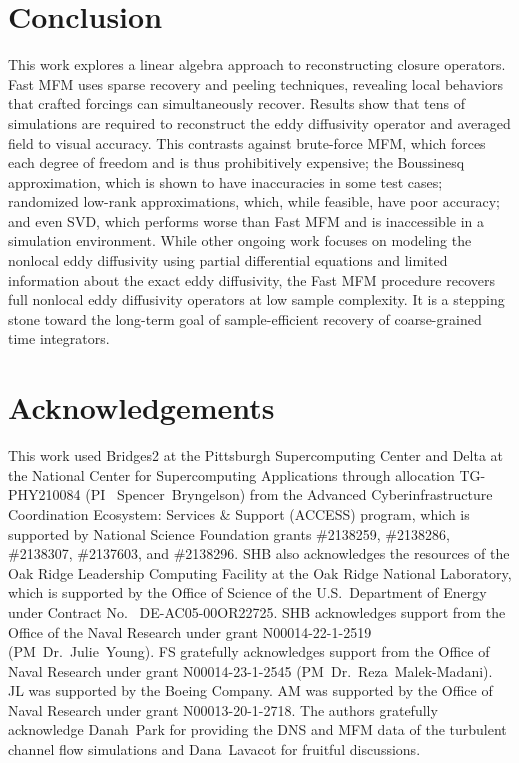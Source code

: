 \documentclass[11pt,sort&compress]{elsarticle}
\begin{document}
\section{Conclusion}\label{s:conclusions}

This work explores a linear algebra approach to reconstructing closure operators.
Fast MFM uses sparse recovery and peeling techniques, revealing local behaviors that crafted forcings can simultaneously recover.
Results show that tens of simulations are required to reconstruct the eddy diffusivity operator and averaged field to visual accuracy.
This contrasts against brute-force MFM, which forces each degree of freedom and is thus prohibitively expensive; the Boussinesq approximation, which is shown to have inaccuracies in some test cases; randomized low-rank approximations, which, while feasible, have poor accuracy; and even SVD, which performs worse than Fast MFM and is inaccessible in a simulation environment.
While other ongoing work focuses on modeling the nonlocal eddy diffusivity using partial differential equations and limited information about the exact eddy diffusivity, the Fast MFM procedure recovers full nonlocal eddy diffusivity operators at low sample complexity. 
It is a stepping stone toward the long-term goal of sample-efficient recovery of coarse-grained time integrators.

\section*{Acknowledgements}

This work used Bridges2 at the Pittsburgh Supercomputing Center and Delta at the National Center for Supercomputing Applications through allocation TG-PHY210084 (PI~ Spencer~Bryngelson) from the Advanced Cyberinfrastructure Coordination Ecosystem: Services \& Support (ACCESS) program, which is supported by National Science Foundation grants \#2138259, \#2138286, \#2138307, \#2137603, and \#2138296.
SHB also acknowledges the resources of the Oak Ridge Leadership Computing Facility at the Oak Ridge National Laboratory, which is supported by the Office of Science of the U.S.\ Department of Energy under Contract No.~ DE-AC05-00OR22725. 
SHB acknowledges support from the Office of the Naval Research under grant N00014-22-1-2519 (PM~Dr.~Julie~Young).
FS gratefully acknowledges support from the Office of Naval Research under grant N00014-23-1-2545 (PM~Dr.~Reza~Malek-Madani).
JL was supported by the Boeing Company. 
AM was supported by the Office of Naval Research under grant N00013-20-1-2718. 
The authors gratefully acknowledge Danah~Park for providing the DNS and MFM data of the turbulent channel flow simulations and Dana~Lavacot for fruitful discussions.



\end{document}
